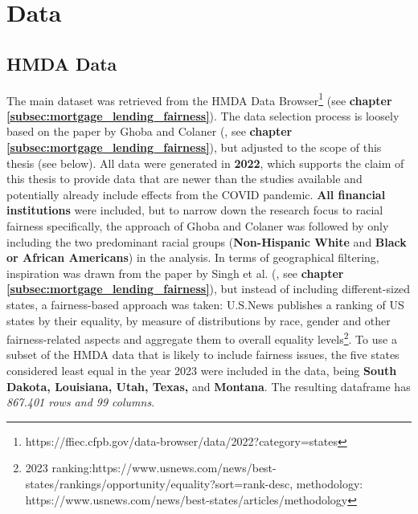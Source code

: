 \section{Data}\label{sec:Data}

\subsection{HMDA Data}\label{subsec:HMDA_Data}

The main dataset was retrieved from the HMDA Data Browser\footnote{https://ffiec.cfpb.gov/data-browser/data/2022?category=states} (see \textbf{chapter \ref{subsec:mortgage_lending_fairness}}). 
The data selection process is loosely based on the paper by Ghoba and Colaner (\cite{Ghoba}, see \textbf{chapter \ref{subsec:mortgage_lending_fairness}}), but adjusted to the scope of this thesis (see below).
All data were generated in \textbf{2022}, which supports the claim of this thesis to provide data that are newer than the studies available and potentially already include effects from the COVID pandemic. 
\textbf{All financial institutions} were included, but to narrow down the research focus to racial fairness specifically, the approach of Ghoba and Colaner was followed by only including the two predominant racial groups (\textbf{Non-Hispanic White} and \textbf{Black or African Americans}) in the analysis. 
In terms of geographical filtering, inspiration was drawn from the paper by Singh et al. (\cite{Singh2022}, see \textbf{chapter \ref{subsec:mortgage_lending_fairness}}), but instead of including different-sized states, a fairness-based approach was taken: 
U.S.News publishes a ranking of US states by their equality, by measure of distributions by race, gender and other fairness-related aspects and aggregate them to overall equality levels\footnote{2023 ranking:https://www.usnews.com/news/best-states/rankings/opportunity/equality?sort=rank-desc, methodology: https://www.usnews.com/news/best-states/articles/methodology}. 
To use a subset of the HMDA data that is likely to include fairness issues, the five states considered least equal in the year 2023 were included in the data, being \textbf{South Dakota, Louisiana, Utah, Texas,} and \textbf{Montana}. The resulting dataframe has \textit{867.401 rows and 99 columns}.

